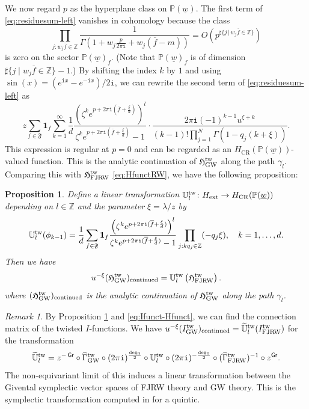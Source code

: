 \documentclass[11pt]{amsart}
\newtheorem{pro}[thm]{Proposition} %
\theoremstyle{definition} %
\theoremstyle{remark} %
\newtheorem{rem}[thm]{Remark}%
\newcommand{\PP}{\mathbb P}
\newcommand{\UU}{\mathbb U}
\newcommand{\ZZ}{\mathbb Z}
\newcommand{\la}{\lambda}
\newcommand{\tw}{{\rm tw}}
\def\GW{\operatorname{\text{GW}}}
\def\CR{\operatorname{\text{CR}}}
\def\ol{\overline}
\def\wt{\widetilde}
\newcommand{\frF}{\mathfrak{F}}
\newcommand{\unit}{\boldsymbol{1}}
\newcommand{\ext}{{\operatorname{ext}}}
\newcommand{\FJRW}{{\operatorname{FJRW}}}
\renewcommand{\GW}{{\operatorname{GW}}}
\renewcommand{\CR}{{\operatorname{CR}}}
\newcommand{\grading}{\operatorname{\mathsf{Gr}}} %
\newcommand{\hGamma}{\widehat{\Gamma}}
\newcommand{\ov}{\overline}
\newcommand{\iu}{\mathtt{i}}
\newcommand{\tUU}{\widetilde{\UU}}
\newcommand{\Hf}{{\mathfrak{H}}}
\newcommand{\uw}{\underline{w}}
\begin{document}
We now regard $p$ as the hyperplane class on $\PP(\uw)$. 
The first term of \eqref{eq:residuesum-left} 
vanishes in cohomology because the class 
\[
\prod_{j: w_j\ov{f}\in\ZZ} 
\frac1{\Gamma(1+w_j\frac{p}{2\pi\iu} +w_j(\ol f -m))}
=O(p^{\sharp\{j \,|\, w_j\ov{f} \in\ZZ\}})
\]
is zero on the sector $\PP(\uw)_f$. 
(Note that $\PP(\uw)_f$ is of dimension 
$\sharp\{j\mid w_j\ov{f}\in \ZZ\}-1$.)  
By shifting the index $k$ by $1$ and using 
$\sin(x) = (e^{\iu x}-e^{-\iu x})/2\iu$, 
we can rewrite the second term of \eqref{eq:residuesum-left} as  
\[
z \sum_{f\in \frF} \unit_f \sum_{k=1}^{\infty} 
\frac{1}{d} 
\frac{\left(\zeta^k e^{p+ 2\pi\iu(\ov{f} + \frac{\xi}{d})}\right)^l}
{\zeta^k e^{p+ 2\pi\iu (\ov{f} +\frac{\xi}{d})}-1} 
\cdot 
\frac{2\pi\iu (-1)^{k-1}u^{\xi+ k}}
{(k-1)!\prod_{j=1}^N \Gamma(1-q_j (k+ \xi)) }.   
\]
This expression is regular at $p=0$ and can be regarded 
as an $H_{\CR}(\PP(\uw))$-valued function. 
This is the analytic continuation of $\Hf^\tw_\GW$ 
along the path $\gamma_l$. 
Comparing this with $\Hf^\tw_{\FJRW}$ \eqref{eq:HfunctRW}, 
we have the following proposition: 
\begin{pro} 
\label{pro:Utw}
Define a linear transformation $\UU^\tw_l 
\colon H_{\ext} \to H_{\CR}(\PP(\uw))$  
depending on $l\in \ZZ$ and the parameter $\xi = \lambda/z$ by 
\begin{equation} 
\label{eq:U} 
\UU^\tw_l (\phi_{k-1}) = 
\frac{1}{d}  
\sum_{f\in \frF} \unit_f 
\frac{\left(
\zeta^k e^{p+ 2\pi\iu(\ov{f} + \frac{\xi}{d})}
\right)^l}
{\zeta^k e^{p+ 2\pi\iu (\ov{f} +\frac{\xi}{d})}-1}
\prod_{j:kq_j\in \ZZ} (-q_j \xi), 
\quad k=1,\dots,d. 
\end{equation} 
Then we have 
\[
u^{-\xi} (\Hf^\tw_\GW)_{\rm continued} = 
\UU^\tw_l \left(\Hf^\tw_{\FJRW}\right).    
\]
where $(\Hf^\tw_\GW)_{\rm continued}$ is the analytic 
continuation of $\Hf^\tw_\GW$ along the path $\gamma_l$. 
\end{pro} 
\begin{rem} 
By Proposition \ref{pro:Utw} and \eqref{eq:Ifunct-Hfunct}, 
we can find the connection matrix of the twisted $I$-functions. 
We have 
$u^{-\xi} (I^\tw_{\GW})_{\rm continued} = 
\tUU^{\tw}_l ( I^\tw_{\FJRW})$ for the transformation 
\[
\tUU^{\tw}_l = 
z^{-\grading} \circ \hGamma^\tw_\GW \circ (2\pi\iu)^{\frac{\deg_0}{2}} \circ 
\UU^\tw_l \circ (2\pi\iu)^{-\frac{\deg_0}{2}} \circ (\hGamma^\tw_{\FJRW})^{-1} 
\circ z^{\grading}. 
\]
The non-equivariant limit of this induces a linear transformation 
between the Givental symplectic vector spaces of  FJRW theory 
and GW theory. 
This is the symplectic transformation 
computed in \cite{ChiRquintic} for a quintic.  
\end{rem} 
\end{document}
